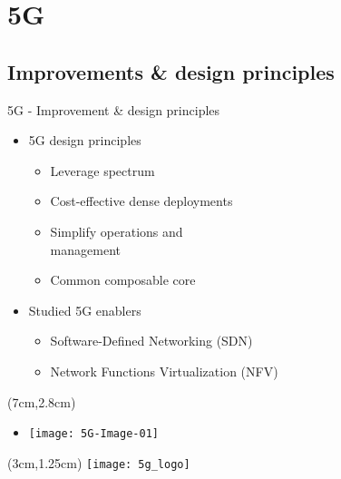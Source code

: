 \section{5G}
\subsection*{Improvements \& design principles}
\begin{frame}{5G - Improvement \& design principles}

  \begin{itemize}
    \item[]<1-> 5G design principles
      \begin{itemize}
      \item<2-> Leverage spectrum
      \item<3-> Cost-effective dense deployments
      \item<4-> Simplify operations and \\ management
      \item<5-> Common composable core
      \end{itemize}
  \end{itemize}

  \begin{itemize}
    \item[]<6-> Studied 5G enablers
      \begin{itemize}
      \item<7-> Software-Defined Networking (SDN)
      \item<8-> Network Functions Virtualization (NFV)
      \end{itemize}
  \end{itemize}


  \begin{textblock*}{5cm}(7cm,2.8cm)
    \begin{itemize}
      \item[]<6-> \texttt{[image: 5G-Image-01]}
    \end{itemize}
  \end{textblock*}

  \begin{textblock*}{5cm}(3cm,1.25cm)
    \texttt{[image: 5g\_logo]}
  \end{textblock*}
\end{frame}
